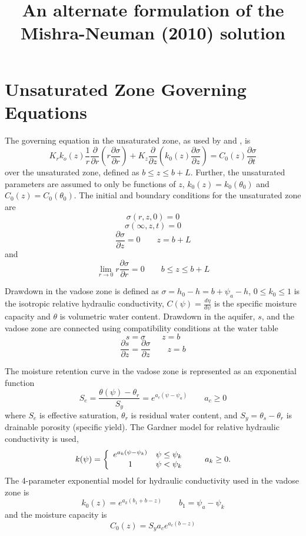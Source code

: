 \documentclass{article}
\begin{document}
\title{An alternate formulation of the Mishra-Neuman (2010) solution}
\section{Unsaturated Zone Governing Equations}
The governing equation in the unsaturated zone, as used by \cite{mishra10} and \cite{tartakovsky07}, is
\begin{equation}
  \label{eq:unsatDim}
  K_r k_o(z) \frac{1}{r} \frac{\partial}{\partial r} \left( r\frac{\partial \sigma}{\partial r} \right) + K_z \frac{\partial}{\partial z} \left( k_0(z) \frac{\partial \sigma}{\partial z}\right) = C_0(z) \frac{\partial \sigma}{\partial t}
\end{equation}
over the unsaturated zone, defined as $b \le z \le b+L$.  Further, the unsaturated parameters are assumed to only be functions of $z$, $k_0(z)=k_0(\theta_0)$ and $C_0(z)=C_0(\theta_0)$.  The initial and boundary conditions for the unsaturated zone are  
$$\sigma(r,z,0) = 0$$
$$\sigma(\infty,z,t)=0$$
$$\frac{\partial \sigma}{\partial z}=0 \qquad z=b+L$$ and 
$$\lim_{r \rightarrow 0} r \frac{\partial \sigma}{\partial r} = 0 \qquad b\le z \le b+L$$

Drawdown in the vadose zone is defined as $\sigma = h_0 - h=b+\psi_a - h$, $0 \le k_0 \le 1$ is the isotropic relative hydraulic conductivity, $C(\psi)=\frac{d\eta}{d \psi}$ is the specific moisture capacity and $\theta$ is volumetric water content.  Drawdown in the aquifer, $s$, and the vadose zone are connected using compatibility conditions at the water table
$$s=\sigma \qquad z=b$$
$$\frac{\partial s}{\partial z}=\frac{\partial \sigma}{\partial z} \qquad z=b$$ 

The moisture retention curve in the vadose zone is represented as an exponential function
$$S_e = \frac{\theta(\psi) - \theta_r}{S_y} = e^{a_c \left( \psi - \psi_a \right)} \qquad a_c \ge 0 $$
where $S_e$ is effective saturation, $\theta_r$ is residual water content, and $S_y=\theta_s - \theta_r$ is drainable porosity (specific yield).  The Gardner model for relative hydraulic conductivity is used,
\begin{equation}
  \nonumber
  k(\psi) = \left  \{ 
    \begin{array}{c c}
      e^{a_k \left( \psi - \psi_k\right)} & \psi \le \psi_k \\
      1 & \psi < \psi_k\\
    \end{array} 
\right . \qquad a_k \ge 0.
\end{equation}
The 4-parameter exponential model for hydraulic conductivity used in the vadose zone is 
\begin{equation}
  \label{eq:Gardner}
 k_0(z)=e^{a_k\left( b_1 + b - z\right)} \qquad b_1=\psi_a-\psi_k
\end{equation}
and the moisture capacity is
\begin{equation}
  \label{eq:mrc}
C_0(z) = S_y a_c e^{a_c \left( b-z\right)}
\end{equation}
\end{document}
